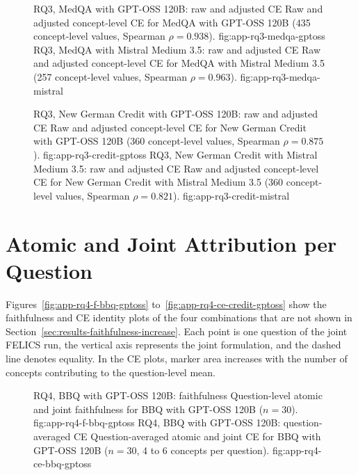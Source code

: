 \begin{figure}[H]
  \centering
    {RQ3, MedQA with GPT-OSS 120B: raw and adjusted CE}%
    {Raw and adjusted concept-level CE for MedQA with GPT-OSS 120B (435 concept-level values, Spearman $\rho=0.938$).}%
    {fig:app-rq3-medqa-gptoss}%
  \hfill
    {RQ3, MedQA with Mistral Medium 3.5: raw and adjusted CE}%
    {Raw and adjusted concept-level CE for MedQA with Mistral Medium 3.5 (257 concept-level values, Spearman $\rho=0.963$).}%
    {fig:app-rq3-medqa-mistral}%
\end{figure}

\begin{figure}[H]
  \centering
    {RQ3, New German Credit with GPT-OSS 120B: raw and adjusted CE}%
    {Raw and adjusted concept-level CE for New German Credit with GPT-OSS 120B (360 concept-level values, Spearman $\rho=0.875$).}%
    {fig:app-rq3-credit-gptoss}%
  \hfill
    {RQ3, New German Credit with Mistral Medium 3.5: raw and adjusted CE}%
    {Raw and adjusted concept-level CE for New German Credit with Mistral Medium 3.5 (360 concept-level values, Spearman $\rho=0.821$).}%
    {fig:app-rq3-credit-mistral}%
\end{figure}

\section{Atomic and Joint Attribution per Question}
\label{app:rq4-identity}

Figures~\ref{fig:app-rq4-f-bbq-gptoss} to~\ref{fig:app-rq4-ce-credit-gptoss} show the faithfulness and CE identity plots of the four combinations that are not shown in Section~\ref{sec:results-faithfulness-increase}. Each point is one question of the joint FELICS run, the vertical axis represents the joint formulation, and the dashed line denotes equality. In the CE plots, marker area increases with the number of concepts contributing to the question-level mean.

\begin{figure}[H]
  \centering
    {RQ4, BBQ with GPT-OSS 120B: faithfulness}%
    {Question-level atomic and joint faithfulness for BBQ with GPT-OSS 120B ($n=30$).}%
    {fig:app-rq4-f-bbq-gptoss}%
  \hfill
    {RQ4, BBQ with GPT-OSS 120B: question-averaged CE}%
    {Question-averaged atomic and joint CE for BBQ with GPT-OSS 120B ($n=30$, 4 to 6 concepts per question).}%
    {fig:app-rq4-ce-bbq-gptoss}%
\end{figure}

